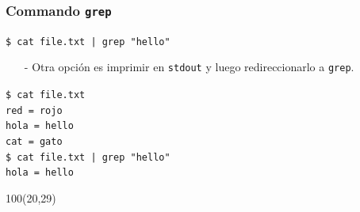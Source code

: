 \documentclass{beamer}
\begin{document}
\begin{frame}[fragile,t]
    \frametitle{Commando \texttt{grep}}
    \begin{block}{\vspace*{-3ex}}
    \texttt{\$}\verb: cat file.txt | grep "hello":
    \vspace*{0.5ex}
    \end{block}
    \vspace{-0.2cm}
    \begin{itemize}
    \item[-] Otra opci\'on es imprimir en \verb|stdout| y luego redireccionarlo a \verb|grep|.
    \end{itemize}
    \vspace{1.8cm}
    \pause
    \begin{block}{\vspace*{-3ex}}
    \texttt{\$}\verb: cat file.txt:\\
    \verb;red = rojo;\\
    \verb;hola = hello;\\
    \verb;cat = gato;\\
    \vspace{0.2cm}
    \texttt{\$}\verb: cat file.txt | grep "hello":\\
    \verb;hola = hello;\\
    \vspace*{0.5ex}
    \end{block}
    \begin{textblock}{100}(20,29)
    \begin{center}
    \end{center}
    \end{textblock}
\end{frame}
\end{document}
